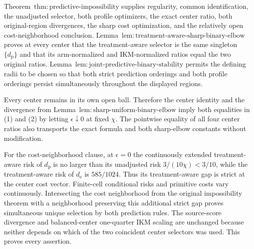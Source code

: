 Theorem~\(\mathrm{thm{:}predictive\text{-}impossibility}\) supplies regularity, common identification, the unadjusted selector, both profile optimizers, the exact center ratio, both original-region divergences, the sharp cost optimization, and the relatively open cost-neighborhood conclusion. Lemma~\(\mathrm{lem{:}treatment\text{-}aware\text{-}sharp\text{-}binary\text{-}elbow}\) proves at every center that the treatment-aware selector is the same singleton \(\{d_{\mathrm p}\}\) and that its arm-normalized and IKM-normalized ratios equal the two original ratios. Lemma~\(\mathrm{lem{:}joint\text{-}predictive\text{-}binary\text{-}stability}\) permits the defining radii to be chosen so that both strict prediction orderings and both profile orderings persist simultaneously throughout the displayed regions.

Every center remains in its own open ball. Therefore the center identity and the divergence from Lemma~\(\mathrm{lem{:}sharp\text{-}uniform\text{-}binary\text{-}elbow}\) imply both equalities in (1) and (2) by letting \(\epsilon\downarrow0\) at fixed \(\chi\). The pointwise equality of all four center ratios also transports the exact formula and both sharp-elbow constants without modification.

For the cost-neighborhood clause, at \(\epsilon=0\) the continuously extended treatment-aware risk of \(d_{\mathrm p}\) is no larger than its unadjusted risk \(3/(10\chi)<3/10\), while the treatment-aware risk of \(d_{\mathrm e}\) is \(585/1024\). Thus its treatment-aware gap is strict at the center cost vector. Finite-cell conditional risks and primitive costs vary continuously. Intersecting the cost neighborhood from the original impossibility theorem with a neighborhood preserving this additional strict gap proves simultaneous unique selection by both prediction rules. The source-score divergence and balanced-center one-quarter IKM scaling are unchanged because neither depends on which of the two coincident center selectors was used. This proves every assertion.